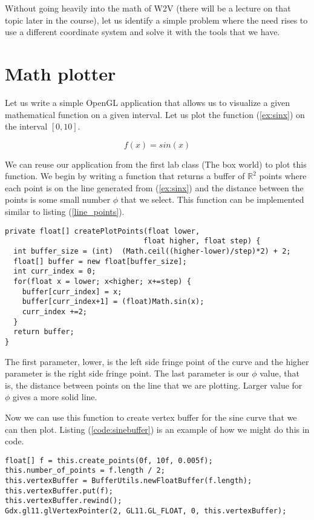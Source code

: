 \documentclass[11pt,a4paper]{article}
\begin{document}
Without going heavily into the math of W2V (there will be a lecture on that
topic later in the course), let us identify a simple problem where the need
rises to use a different coordinate system and solve it with the tools that we
have.

\section{Math plotter}
Let us write a simple OpenGL application that allows us to visualize a given
mathematical function on a given interval. Let us plot the function
(\ref{ex:sinx}) on the interval $[0, 10]$.

\begin{equation}\label{ex:sinx}
f(x) = sin(x)
\end{equation}

We can reuse our application from the first lab class (The box world) to plot
this function. We begin by writing a function that returns a buffer of
$\mathbb{R}^2$ points where each point is on the line generated from
(\ref{ex:sinx}) and the distance between the points is some small number $\phi$
that we select. This function can be implemented similar to listing
(\ref{line_points}).

\begin{lstlisting}[texcl, caption=Function for calculating porints on line on some interval for sin(x), label=line_points]
private float[] createPlotPoints(float lower, 
                                float higher, float step) {		
  int buffer_size = (int)  (Math.ceil((higher-lower)/step)*2) + 2;
  float[] buffer = new float[buffer_size];
  int curr_index = 0;
  for(float x = lower; x<higher; x+=step) {
    buffer[curr_index] = x;
	buffer[curr_index+1] = (float)Math.sin(x);
	curr_index +=2;
  }
  return buffer;
}
\end{lstlisting}


The first parameter, lower, is the left side fringe point of the curve and the
higher parameter is the right side fringe point. The last parameter is our
$\phi$ value, that is, the distance between points on the line that we are
plotting. Larger value for $\phi$ gives a more solid line. 

Now we can use this function to create vertex buffer for the sine curve
that we can then plot. Listing (\ref{code:sinebuffer}) is an example of how
we might do this in code.


\begin{lstlisting}[texcl,label=code:sinebuffer, caption=Create vertex buffer for our sine function. ]
float[] f = this.create_points(0f, 10f, 0.005f);
this.number_of_points = f.length / 2;
this.vertexBuffer = BufferUtils.newFloatBuffer(f.length);		
this.vertexBuffer.put(f);
this.vertexBuffer.rewind();
Gdx.gl11.glVertexPointer(2, GL11.GL_FLOAT, 0, this.vertexBuffer);
\end{lstlisting}
\end{document}
